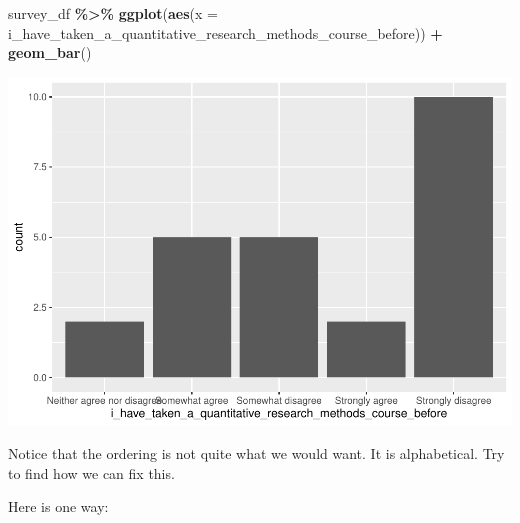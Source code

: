 \documentclass[
]{book}
\newenvironment{Shaded}{\begin{snugshade}}{\end{snugshade}}
\newcommand{\DataTypeTok}[1]{\textcolor[rgb]{0.13,0.29,0.53}{#1}}
\newcommand{\KeywordTok}[1]{\textcolor[rgb]{0.13,0.29,0.53}{\textbf{#1}}}
\newcommand{\NormalTok}[1]{#1}
\newcommand{\OperatorTok}[1]{\textcolor[rgb]{0.81,0.36,0.00}{\textbf{#1}}}
\newcommand{\StringTok}[1]{\textcolor[rgb]{0.31,0.60,0.02}{#1}}
\begin{document}
\begin{Shaded}
\begin{Highlighting}[]
\NormalTok{survey\_df }\OperatorTok{\%\textgreater{}\%}\StringTok{ }
\StringTok{  }\KeywordTok{ggplot}\NormalTok{(}\KeywordTok{aes}\NormalTok{(}\DataTypeTok{x =}\NormalTok{ i\_have\_taken\_a\_quantitative\_research\_methods\_course\_before)) }\OperatorTok{+}
\StringTok{  }\KeywordTok{geom\_bar}\NormalTok{()}
\end{Highlighting}
\end{Shaded}

\includegraphics{test_course_notes_files/figure-latex/geom-bar-1.pdf}

Notice that the ordering is not quite what we would want. It is alphabetical. Try to find how we can fix this.

Here is one way:
\end{document}

